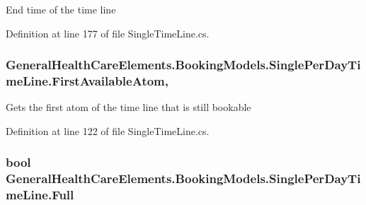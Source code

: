 End time of the time line 



Definition at line 177 of file Single\+Time\+Line.\+cs.

\subsubsection[{\texorpdfstring{First\+Available\+Atom}{FirstAvailableAtom}}]{ General\+Health\+Care\+Elements.\+Booking\+Models.\+Single\+Per\+Day\+Time\+Line.\+First\+Available\+Atom\hspace{0.3cm}{\ttfamily [get]}, {\ttfamily [set]}}\hypertarget{class_general_health_care_elements_1_1_booking_models_1_1_single_per_day_time_line_a3605e90cfa9f8ba7e635e4f62debd5c4}{}\label{class_general_health_care_elements_1_1_booking_models_1_1_single_per_day_time_line_a3605e90cfa9f8ba7e635e4f62debd5c4}


Gets the first atom of the time line that is still bookable 



Definition at line 122 of file Single\+Time\+Line.\+cs.

\subsubsection[{\texorpdfstring{Full}{Full}}]{\setlength{\rightskip}{0pt plus 5cm}bool General\+Health\+Care\+Elements.\+Booking\+Models.\+Single\+Per\+Day\+Time\+Line.\+Full\hspace{0.3cm}{\ttfamily [get]}}\hypertarget{class_general_health_care_elements_1_1_booking_models_1_1_single_per_day_time_line_a007cbae501dd6f2bfebcdbd701725ef8}{}\label{class_general_health_care_elements_1_1_booking_models_1_1_single_per_day_time_line_a007cbae501dd6f2bfebcdbd701725ef8}


